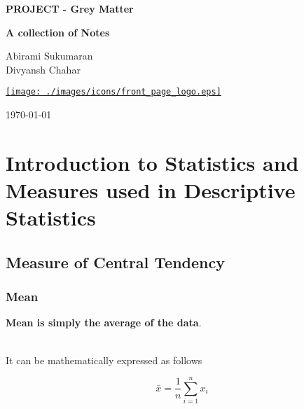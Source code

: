\documentclass[twoside,12pt]{report}  %
\begin{document}
	\begin{titlepage}
		\begin{center}
			{\LARGE \textbf{PROJECT - Grey Matter}}\\
			
			\hrulefill
			
			\textbf{A collection of Notes}
			
			\null
			
			Abirami Sukumaran \\
			Divyansh Chahar
			
			
			\vfill
			
			\href{https://github.com/divyanshchahar/Grey-Matter}{\texttt{[image: ./images/icons/front\_page\_logo.eps]}}
			
			\null
					
			\vfill
			
			\today
			
		\end{center}
	\end{titlepage}





\printnomenclature


\setcounter{page}{1}

\chapter{Introduction to Statistics and Measures used in Descriptive Statistics}
\section{Measure of Central Tendency}
\noindent
\subsection{Mean}
\begin{tcolorbox}[colback=red!5!white,colframe=red!75!black, title= \textbf{Mean}]
	\textbf{Mean is simply the average of the data}. 
\end{tcolorbox}
\noindent
\\
It can be mathematically expressed as follows

$$\bar{x} = \frac{1}{n}\sum_{i=1}^{n}x_i$$
%
\end{document}
